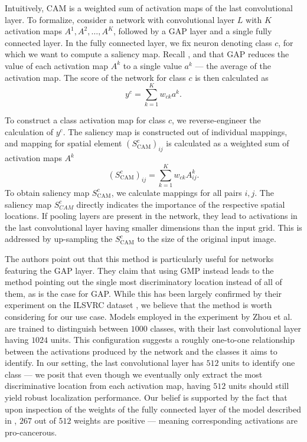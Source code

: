 Intuitively, CAM is a weighted sum of activation maps of the last convolutional layer.
To formalize, consider a network with convolutional layer $L$ with $K$ activation maps $A^1, A^2, \ldots, A^K$, followed by a GAP layer and a single fully connected layer.
In the fully connected layer, we fix neuron denoting class $c$, for which we want to compute a saliency map.
Recall , and that GAP reduces the value of each activation map $A^k$ to a single value $a^k$ --- the average of the activation map.
The score of the network for class $c$ is then calculated as
\begin{equation}\label{eq:gap-score}
    y^c = \sum_{k=1}^K w_{ck} a^k.
\end{equation}

To construct a class activation map for class $c$, we reverse-engineer the calculation of $y^c$. The saliency map is constructed out of individual mappings, and mapping for spatial element $(S^c_{\text{CAM}})_{ij}$ is calculated as a weighted sum of activation maps $A^k$
\begin{equation}\label{eq:cam}
    (S^c_{\text{CAM}})_{ij} = \sum_{k=1}^K w_{ck}  A^k_{ij}.
\end{equation}
To obtain saliency map $S^c_{\text{CAM}}$, we calculate mappings for all pairs $i, j$.
The saliency map $S^c_{CAM}$ directly indicates the importance of the respective spatial locations.
If pooling layers are present in the network, they lead to activations in the last convolutional layer having smaller dimensions than the input grid.
This is addressed by up-sampling the $S^c_{\text{CAM}}$ to the size of the original input image.

The authors point out that this method is particularly useful for networks featuring the GAP layer.
They claim that using GMP instead leads to the method pointing out the single most discriminatory location instead of all of them, as is the case for GAP.
While this has been largely confirmed by their experiment on the ILSVRC dataset \cite{ilsvrc}, we believe that the method is worth considering for our use case.
Models employed in the experiment by Zhou et al. \cite{cam} are trained to distinguish between $1000$ classes, with their last convolutional layer having $1024$ units.
This configuration suggests a roughly one-to-one relationship between the activations produced by the network and the classes it aims to identify.
In our setting, the last convolutional layer has $512$ units to identify one class --- we posit that even though we eventually only extract the most discriminative location from each activation map, having $512$ units should still yield robust localization performance.
Our belief is supported by the fact that upon inspection of the weights of the fully connected layer of the model described in , $267$ out of $512$ weights are positive --- meaning corresponding activations are pro-cancerous.


